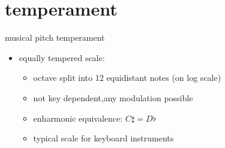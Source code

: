     \section{temperament}
        \begin{frame}{musical pitch}{ temperament}
            \begin{itemize}
                \item	equally tempered scale:
                    \begin{itemize}
                        \item   octave split into 12 equidistant notes (on log scale)
                        \item   not key dependent,any modulation possible
                        \item   enharmonic equivalence: $C\sharp = D\flat$
                        \item   typical scale for keyboard instruments
                    \end{itemize}
                    



\end{itemize}
\end{frame}
